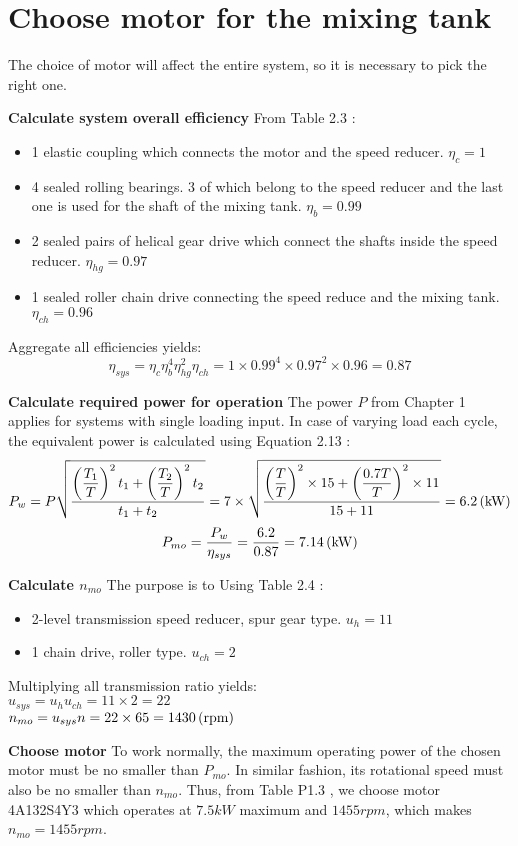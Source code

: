 \section{Choose motor for the mixing tank}
The choice of motor will affect the entire system, so it is necessary to pick the right one.

\textbf{Calculate system overall efficiency} From Table 2.3 \cite{tk1}:
\begin{itemize}
	\item 1 elastic coupling which connects the motor and the speed reducer. $ \eta_c = 1 $
	\item 4 sealed rolling bearings. 3 of which belong to the speed reducer and the last one is used for the shaft of the mixing tank. $ \eta_b = 0.99 $
	\item 2 sealed pairs of helical gear drive which connect the shafts inside the speed reducer. $ \eta_{hg} = 0.97 $
	\item 1 sealed roller chain drive connecting the speed reduce and the mixing tank. $ \eta_{ch} = 0.96 $
\end{itemize}
Aggregate all efficiencies yields: 
\[\eta_{sys} = \eta_c\eta_b^4\eta_{hg}^2\eta_{ch} = 1 \times 0.99^4 \times 0.97^2 \times 0.96 = 0.87\]

\textbf{Calculate required power for operation}
The power $ P $ from Chapter 1 applies for systems with single loading input. In case of varying load each cycle, the equivalent power is calculated using  Equation 2.13 \cite{tk1}:
\[
P_w = P\sqrt{\dfrac{\left(\dfrac{T_1}{T}\right)^2t_1 + \left(\dfrac{T_2}{T}\right)^2t_2}{t_1+t_2}} = 7 \times \sqrt{\dfrac{\left(\dfrac{T}{T}\right)^2\times15 + \left(\dfrac{0.7T}{T}\right)^2\times11}{15+11}} = 6.2 \, (\mathrm{kW})
\]
\[
P_{mo} = \dfrac{P_w}{\eta_{sys}} = \dfrac{6.2}{0.87} = 7.14 \, (\mathrm{kW})
\]

\textbf{Calculate $ n_{mo} $} The purpose is to Using Table 2.4 \cite{tk1}:
\begin{itemize}
	\item 2-level transmission speed reducer, spur gear type. $ u_{h} = 11 $
	\item 1 chain drive, roller type. $ u_{ch} = 2$
\end{itemize}
Multiplying all transmission ratio yields:\\
$ u_{sys} = u_{h}u_{ch} = 11 \times 2 = 22 $\\
$ n_{mo} = u_{sys}n = 22 \times 65 = 1430 \, (\mathrm{rpm}) $

\textbf{Choose motor}
To work normally, the maximum operating power of the chosen motor must be no smaller than $ P_{mo} $. In similar fashion, its rotational speed must also be no smaller than  $ n_{mo} $. Thus, from Table P1.3 \cite{tk1}, we choose motor 4A132S4Y3 which operates at $ 7.5 \unit{kW} $ maximum and $ 1455 \unit{rpm} $, which makes $ n_{mo} = 1455\unit{rpm}$.

